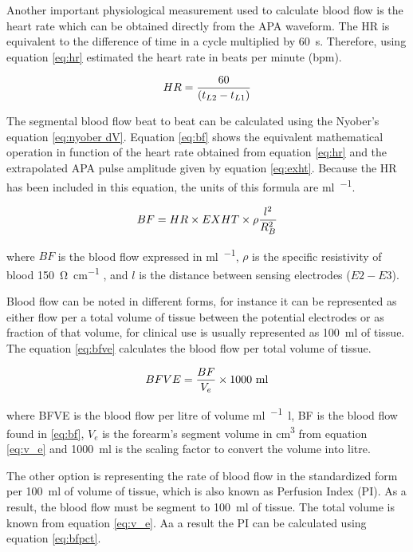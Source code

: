 Another important physiological measurement used to calculate blood flow is the heart rate which can be obtained directly from the APA waveform. The HR is equivalent to the difference of time in a cycle multiplied by \SI{60}{\second}. Therefore, using equation \ref{eq:hr} estimated the heart rate in beats per minute (\si{bpm}).

\begin{align}
	\label{eq:hr}
	HR = \frac{60}{(t_{L2}-t_{L1})}  \tagaddtext{[\si{bpm}]}
\end{align}

The segmental blood flow beat to beat can be calculated using the Nyober's equation \ref{eq:nyober dV}. Equation \ref{eq:bf} shows the equivalent mathematical operation in function of the heart rate obtained from equation \ref{eq:hr} and the extrapolated APA pulse amplitude given by equation \ref{eq:exht}. Because the HR has been included in this equation, the units of this formula are \si{\milli\litre\per\min}. 

\begin{align}
	\label{eq:bf}
	BF = HR \times EXHT \times \rho \frac{l^2}{R_B^2} \tagaddtext{[\si{\ml\per\min}]}
\end{align}

where $BF$ is the blood flow expressed in \si{\milli\litre\per\min}, $\rho$ is the specific resistivity of blood \SI{150}{\ohm\per\cm} \cite{mohapatra1981non, nyober1950electrical}, and $l$ is the distance between sensing electrodes ($E2 - E3$).

Blood flow can be noted in different forms, for instance it can be represented as either flow per a total volume of tissue between the potential electrodes or as fraction of that volume, for clinical use is usually represented as \SI{100}{\milli\litre} of tissue. The equation \ref{eq:bfve} calculates the blood flow per total volume of tissue.

\begin{align}
	\label{eq:bfve}
	BFVE = \frac{BF}{V_e} \times \text{1000 ml} \tagaddtext{[\si{\ml\per\min.\litre}]}
\end{align}

where BFVE is the blood flow per litre of volume \si{\ml\per\min.\litre}, BF is the blood flow found in \ref{eq:bf}, $V_e$ is the forearm's segment volume in \si{\cubic\cm} from equation \ref{eq:v_e} and \SI{1000}{\milli\litre} is the scaling factor to convert the volume into litre.

The other option is representing the rate of blood flow in the standardized form per \SI{100}{\milli\litre} of volume of tissue, which is also known as Perfusion Index (PI). As a result, the blood flow must be segment to \SI{100}{\milli\litre} of tissue. The total volume is known from equation \ref{eq:v_e}. Aa a result the PI can be calculated using equation  \ref{eq:bfpct}. 

